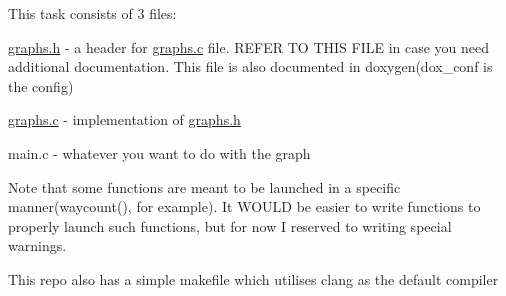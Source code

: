 This task consists of 3 files\+:


\begin{DoxyEnumerate}
\item \mbox{\hyperlink{graphs_8h}{graphs.\+h}} -\/ a header for \mbox{\hyperlink{graphs_8c}{graphs.\+c}} file. R\+E\+F\+ER TO T\+H\+IS F\+I\+LE in case you need additional documentation. This file is also documented in doxygen(dox\+\_\+conf is the config)
\item \mbox{\hyperlink{graphs_8c}{graphs.\+c}} -\/ implementation of \mbox{\hyperlink{graphs_8h}{graphs.\+h}}
\item main.\+c -\/ whatever you want to do with the graph
\end{DoxyEnumerate}

Note that some functions are meant to be launched in a specific manner(waycount(), for example). It W\+O\+U\+LD be easier to write functions to properly launch such functions, but for now I reserved to writing special warnings.

This repo also has a simple makefile which utilises clang as the default compiler 